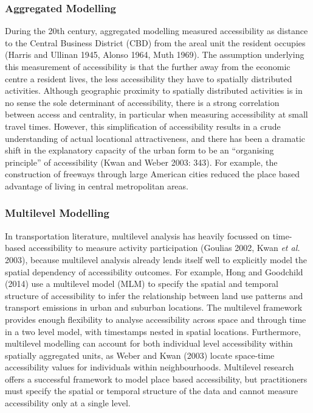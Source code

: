 \documentclass[a4paper,UKenglish]{lipics-v2018}
\begin{document}
\subsubsection{Aggregated Modelling}
During the 20th century, aggregated modelling measured accessibility as distance to the Central Business District (CBD) from the areal unit the resident occupies (Harris and Ullinan 1945, Alonso 1964, Muth 1969). The assumption underlying this measurement of accessibility is that the further away from the economic centre a resident lives, the less accessibility they have to spatially distributed activities. Although geographic proximity to spatially distributed activities is in no sense the sole determinant of accessibility, there is a strong correlation between access and centrality, in particular when measuring accessibility at small travel times. However, this simplification of accessibility results in a crude understanding of actual locational attractiveness, and there has been a dramatic shift in the explanatory capacity of the urban form to be an “organising principle” of accessibility (Kwan and Weber 2003: 343). For example, the construction of freeways through large American cities reduced the place based advantage of living in central metropolitan areas. 

\subsubsection{Multilevel Modelling}
In transportation literature, multilevel analysis has heavily focussed on time-based accessibility to measure activity participation (Goulias 2002, Kwan \textit{et al.} 2003), because multilevel analysis already lends itself well to explicitly model the spatial dependency of accessibility outcomes. For example, Hong and Goodchild (2014) use a multilevel model (MLM) to specify the spatial and temporal structure of accessibility to infer the relationship between land use patterns and transport emissions in urban and suburban locations. The multilevel framework provides enough flexibility to analyse accessibility across space and through time in a two level model, with timestamps nested in spatial locations. Furthermore, multilevel modelling can account for both individual level accessibility within spatially aggregated units, as Weber and Kwan (2003) locate space-time accessibility values for individuals within neighbourhoods. Multilevel research offers a successful framework to model place based accessibility, but practitioners must specify the spatial or temporal structure of the data and cannot measure accessibility only at a single level.
\end{document}
